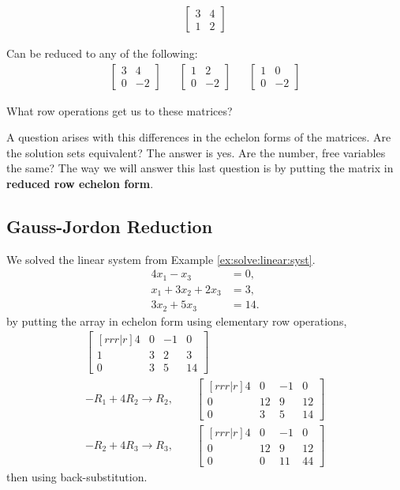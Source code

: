 %
\begin{align*}
\begin{bmatrix}
3 & 4 \\
1 & 2
\end{bmatrix}
\end{align*}

Can be reduced to any of the following:
%
\begin{align*}
\begin{bmatrix}
3 & 4 \\
0 & -2 
\end{bmatrix} &&
\begin{bmatrix}
1 & 2 \\
0 & -2 
\end{bmatrix} &&
\begin{bmatrix}
1 & 0 \\
0 & -2 
\end{bmatrix} 
\end{align*}

What row operations get us to these matrices?  

A question arises with this differences in the echelon forms of the matrices.  Are the solution sets equivalent?  The answer is yes.  Are the number, free variables the same?    The way we will answer this last question is by putting the matrix in \textbf{reduced row echelon form}.

\subsection{Gauss-Jordon Reduction}


We solved the linear system from Example \ref{ex:solve:linear:syst}.  
%
\begin{align*}
4x_1 - x_3 & = 0, \\
x_1+3x_2 +2x_3 & = 3, \\
3x_2 + 5x_3 & = 14. 
\end{align*}
%
by putting the array in echelon form using elementary row operations, 
\begin{align*}
\begin{bmatrix}[rrr|r]
4 & 0 & -1 & 0 \\
1 & 3 & 2 & 3 \\
0 & 3 & 5 & 14 
\end{bmatrix} \\
-R_1 + 4R_2 \rightarrow R_2,  \qquad
\begin{bmatrix}[rrr|r]
4 & 0 & -1 & 0 \\
0 & 12 & 9 & 12 \\
0 & 3 & 5 & 14 
\end{bmatrix} \\
-R_2 + 4R_3 \rightarrow R_3, \qquad
\begin{bmatrix}[rrr|r]
4 & 0 & -1 & 0 \\
0 & 12 & 9 & 12 \\
0 & 0 & 11 & 44 
\end{bmatrix} 
\end{align*}
then using back-substitution.  


